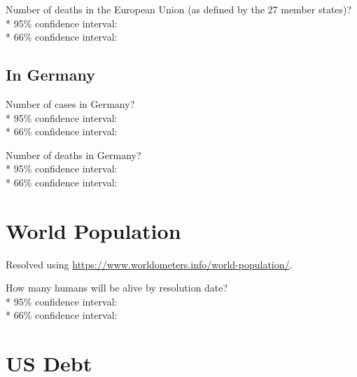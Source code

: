 \documentclass{article}
\begin{document}
\vspace{0.3cm}

Number of deaths in the European Union (as defined by the 27 member
states)?\\*
95\% confidence interval: \null\hfill\underline{\hspace{8cm}}\\*
66\% confidence interval: \null\hfill\underline{\hspace{8cm}}

\subsection*{In Germany}

Number of cases in Germany?\\*
95\% confidence interval: \null\hfill\underline{\hspace{8cm}}\\*
66\% confidence interval: \null\hfill\underline{\hspace{8cm}}

\vspace{0.3cm}

Number of deaths in Germany?\\*
95\% confidence interval: \null\hfill\underline{\hspace{8cm}}\\*
66\% confidence interval: \null\hfill\underline{\hspace{8cm}}

\section*{World Population}

Resolved using
\href{https://www.worldometers.info/world-population/}{https://www.worldometers.info/world-population/}.

\vspace{0.3cm}

How many humans will be alive by resolution date?\\*
95\% confidence interval: \null\hfill\underline{\hspace{8cm}}\\*
66\% confidence interval: \null\hfill\underline{\hspace{8cm}}

\section*{US Debt}
\end{document}
